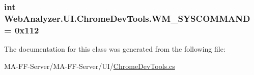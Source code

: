 \subsubsection[{W\+M\+\_\+\+S\+Y\+S\+C\+O\+M\+M\+A\+N\+D}]{\setlength{\rightskip}{0pt plus 5cm}int Web\+Analyzer.\+U\+I.\+Chrome\+Dev\+Tools.\+W\+M\+\_\+\+S\+Y\+S\+C\+O\+M\+M\+A\+N\+D = 0x112\hspace{0.3cm}{\ttfamily [static]}}\label{class_web_analyzer_1_1_u_i_1_1_chrome_dev_tools_a4e5a194cb8f1eb30877f810655d14f6f}


The documentation for this class was generated from the following file\+:\begin{DoxyCompactItemize}
\item 
M\+A-\/\+F\+F-\/\+Server/\+M\+A-\/\+F\+F-\/\+Server/\+U\+I/\hyperlink{_chrome_dev_tools_8cs}{Chrome\+Dev\+Tools.\+cs}\end{DoxyCompactItemize}
